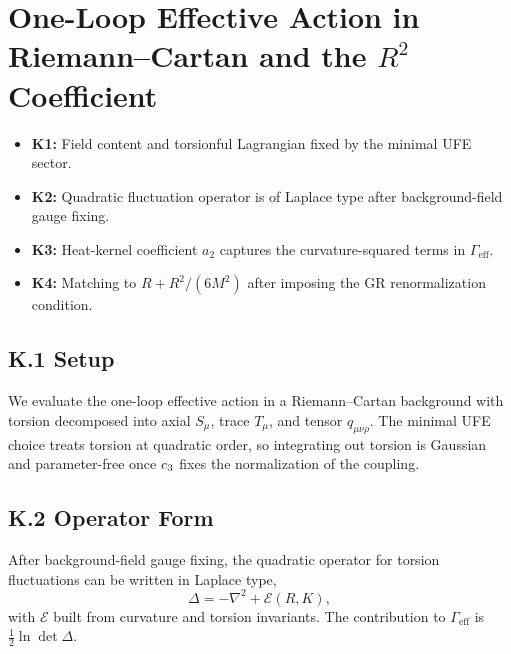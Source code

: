 \section{\texorpdfstring{One-Loop Effective Action in Riemann--Cartan and the $R^2$ Coefficient}{One-Loop Effective Action in Riemann--Cartan and the R2 Coefficient}}
\label{app:r2}

\begin{tcolorbox}[colback=gray!5, colframe=gray!60, 
    title={\textbf{Assumptions K1--K4}}, fonttitle=\bfseries\small]
\begin{itemize}[leftmargin=1.5em, topsep=2pt, itemsep=1pt]
    \item \textbf{K1:} Field content and torsionful Lagrangian fixed by the minimal UFE sector.
    \item \textbf{K2:} Quadratic fluctuation operator is of Laplace type after background-field gauge fixing.
    \item \textbf{K3:} Heat-kernel coefficient $a_2$ captures the curvature-squared terms in $\Gamma_{\mathrm{eff}}$.
    \item \textbf{K4:} Matching to $R + R^2/(6M^2)$ after imposing the GR renormalization condition.
\end{itemize}
\end{tcolorbox}

\subsection{K.1 Setup}
We evaluate the one-loop effective action in a Riemann--Cartan background with torsion
decomposed into axial $S_\mu$, trace $T_\mu$, and tensor $q_{\mu\nu\rho}$. The minimal UFE
choice treats torsion at quadratic order, so integrating out torsion is Gaussian and
parameter-free once $c_3$ fixes the normalization of the coupling.

\subsection{K.2 Operator Form}
After background-field gauge fixing, the quadratic operator for torsion fluctuations can be
written in Laplace type,
\begin{equation}
    \Delta = -\nabla^2 + \mathcal{E}(R,K),
\end{equation}
with $\mathcal{E}$ built from curvature and torsion invariants. The contribution to
$\Gamma_{\mathrm{eff}}$ is $\frac{1}{2}\ln\det\Delta$.

